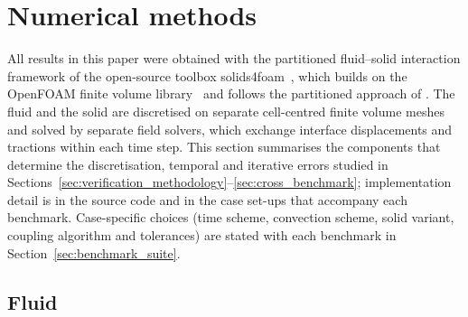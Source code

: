 \section{Numerical methods}\label{sec:numerical_methods}

All results in this paper were obtained with the partitioned fluid--solid interaction framework of the open-source toolbox solids4foam~\citep{Cardiff2025}, which builds on the OpenFOAM finite volume library~\citep{Weller1998} and follows the partitioned approach of \citet{Tukovic2018}.
The fluid and the solid are discretised on separate cell-centred finite volume meshes and solved by separate field solvers, which exchange interface displacements and tractions within each time step.
This section summarises the components that determine the discretisation, temporal and iterative errors studied in Sections~\ref{sec:verification_methodology}--\ref{sec:cross_benchmark}; implementation detail is in the source code and in the case set-ups that accompany each benchmark.
Case-specific choices (time scheme, convection scheme, solid variant, coupling algorithm and tolerances) are stated with each benchmark in Section~\ref{sec:benchmark_suite}.

\subsection{Fluid}\label{sec:fluid_solver}

